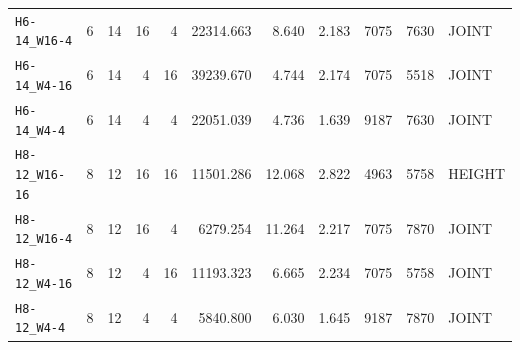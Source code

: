 \begin{table}[t]
\begin{tabular}{lrrrrrrrrrl}
\nolinkurl{H6-14_W16-4} & 6 & 14 & 16 & 4 & 22314.663 & 8.640 & 2.183 & 7075 & 7630 & JOINT \\
\nolinkurl{H6-14_W4-16} & 6 & 14 & 4 & 16 & 39239.670 & 4.744 & 2.174 & 7075 & 5518 & JOINT \\
\nolinkurl{H6-14_W4-4} & 6 & 14 & 4 & 4 & 22051.039 & 4.736 & 1.639 & 9187 & 7630 & JOINT \\
\nolinkurl{H8-12_W16-16} & 8 & 12 & 16 & 16 & 11501.286 & 12.068 & 2.822 & 4963 & 5758 & HEIGHT \\
\nolinkurl{H8-12_W16-4} & 8 & 12 & 16 & 4 & 6279.254 & 11.264 & 2.217 & 7075 & 7870 & JOINT \\
\nolinkurl{H8-12_W4-16} & 8 & 12 & 4 & 16 & 11193.323 & 6.665 & 2.234 & 7075 & 5758 & JOINT \\
\nolinkurl{H8-12_W4-4} & 8 & 12 & 4 & 4 & 5840.800 & 6.030 & 1.645 & 9187 & 7870 & JOINT \\
\bottomrule
\end{tabular}
\end{table}
